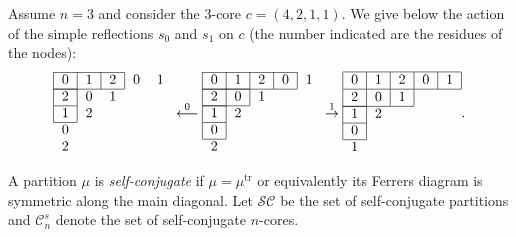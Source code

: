 \documentclass[10pt,a4paper]{amsart}
\numberwithin{equation}{section}
\newcommand{\cC}{\mathcal{C}}
\begin{document}
\begin{Example}
Assume $n=3$ and consider the $3$-core $c=(4,2,1,1)$. We give below the
action of the simple reflections $s_{0}$ and $s_{1}$ on $c$ (the number
indicated are the residues of the nodes):
\begin{equation*}
\begin{tabular}{lllll}
\cline{1-3}
\multicolumn{1}{|l}{$0$} & \multicolumn{1}{|l}{$1$} & \multicolumn{1}{|l}{$2$%
} & \multicolumn{1}{|l}{$0$} & $1$ \\ \cline{1-1}\cline{1-3}
\multicolumn{1}{|l}{$2$} & \multicolumn{1}{|l}{$0$} & $1$ & & \\
\cline{1-1}
\multicolumn{1}{|l}{$1$} & \multicolumn{1}{|l}{$2$} & & & \\ \cline{1-1}
$0$ & & & & \\
$2$ & & & &
\end{tabular}%
\overset{0}{\longleftarrow }%
\begin{tabular}{lllll}
\cline{1-4}
\multicolumn{1}{|l}{$0$} & \multicolumn{1}{|l}{$1$} & \multicolumn{1}{|l}{$2$%
} & \multicolumn{1}{|l}{$0$} & \multicolumn{1}{|l}{$1$} \\
\cline{1-2}\cline{1-4}
\multicolumn{1}{|l}{$2$} & \multicolumn{1}{|l}{$0$} & \multicolumn{1}{|l}{$1$%
} & & \\ \cline{1-1}\cline{1-2}
\multicolumn{1}{|l}{$1$} & \multicolumn{1}{|l}{$2$} & & & \\ \cline{1-1}
\multicolumn{1}{|l}{$0$} & \multicolumn{1}{|l}{} & & & \\ \cline{1-1}
$2$ & & & &
\end{tabular}%
\overset{1}{\rightarrow }%
\begin{tabular}{lllll}
\hline
\multicolumn{1}{|l}{$0$} & \multicolumn{1}{|l}{$1$} & \multicolumn{1}{|l}{$2$%
} & \multicolumn{1}{|l}{$0$} & \multicolumn{1}{|l|}{$1$} \\ \hline
\multicolumn{1}{|l}{$2$} & \multicolumn{1}{|l}{$0$} & \multicolumn{1}{|l}{$1$%
} & \multicolumn{1}{|l}{} & \\ \cline{1-1}\cline{1-3}
\multicolumn{1}{|l}{$1$} & \multicolumn{1}{|l}{$2$} & & & \\ \cline{1-1}
\multicolumn{1}{|l}{$0$} & \multicolumn{1}{|l}{} & & & \\ \cline{1-1}
$1$ & & & &
\end{tabular}.%
\end{equation*}
\end{Example}


A partition $\mu$ is \textit{self-conjugate} if $\mu=\mu^{\mathrm{tr}}$ or equivalently its Ferrers diagram is symmetric along the main diagonal. Let $\mathcal{SC}$ be the set of self-conjugate partitions and $\cC_{n}^s$ denote the set of self-conjugate $n$-cores.
\end{document}
